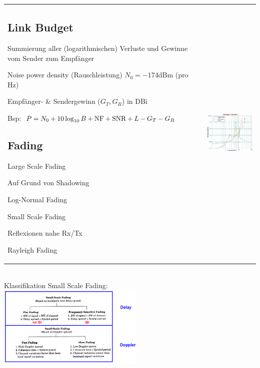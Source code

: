 \begin{tabular}{ll}
\parbox{11cm}{
	\subsection{Link Budget }
	\begin{liste}
	    \item Summierung aller (logarithmischen) Verluste und Gewinne vom Sender
	    zum Empfänger
	    \item Noise power density (Rauschleistung) $N_0 = -174\text{dBm}$ (pro Hz)
	    \item Empfänger- \& Sendergewinn ($G_T, G_R$) in DBi
	    \item Bsp: $P=N_0+10 \log_{10} B+\text{NF}+\text{SNR}+L-G_T-G_R$
	\end{liste}

	\subsection{Fading }
	\begin{liste}
	    \item Large Scale Fading
	    	\begin{liste}
	    		\item Auf Grund von Shadowing
	    		\item Log-Normal Fading
	    	\end{liste}
	    \item Small Scale Fading 
	    	\begin{liste}
		    	\item Reflexionen nahe Rx/Tx
		    	\item Rayleigh Fading
	    	\end{liste}
	\end{liste}
    }
& \parbox{7cm}{
    \includegraphics[width=7cm]{./bilder/propagation-atmospheric-absorption.png}}
\end{tabular}
\\
Klassifikation Small Scale Fading:\\
    \includegraphics[width=7cm]{./bilder/classificationSmallScaleFading.png}
